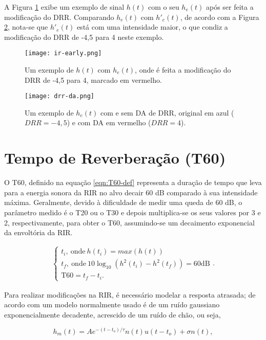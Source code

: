 A Figura \ref{fig:ir-early} exibe um exemplo de sinal $h(t)$ com o seu $h_e(t)$ após ser feita a modificação do DRR.
Comparando $h_e(t)$ com $h'_e(t)$, de acordo com a Figura \ref{fig:drr-da}, nota-se que $h'_e(t)$  está com uma intensidade 
maior, o que condiz a modificação do DRR de -4,5 para 4 neste exemplo.

\begin{figure}[H]
    \centering
    \texttt{[image: ir-early.png]}
    \caption{Um exemplo de $h(t)$ com $h_e(t)$, onde é feita a modificação do DRR de -4,5 para 4, marcado em vermelho.}
    \label{fig:ir-early}
\end{figure} 

\begin{figure}[H]
    \centering
    \texttt{[image: drr-da.png]}
    \caption{Um exemplo de $h_e(t)$ com e sem DA de DRR, original em azul ($DRR=-4,5$) e com DA em vermelho ($DRR=4$).}
    \label{fig:drr-da}
\end{figure} 


\section{Tempo de Reverberação (T60)}


O T60, definido na equação \ref{eqn:T60-def} representa a duração de tempo que leva para a energia sonora da RIR
no alvo decair 60 dB comparado à sua intensidade máxima. Geralmente, devido à dificuldade de medir uma queda de 60 dB,
o parâmetro medido é o T20 ou o T30 e depois multiplica-se os seus valores por 3 e 2, respectivamente, para obter o T60,
assumindo-se um decaimento exponencial da envoltória da RIR.

\begin{align} \label{eqn:T60-def}
    \begin{cases}
        t_i, \ \text{onde} \ h(t_i) = max(h(t)) \\
        t_f, \ \text{onde} \ 10 \log_{10} \left( h^2(t_i) - h^2(t_f) \right) = 60 \text{dB} \\
        \text{T60} = t_f-t_i.
    \end{cases}
    .
\end{align}

Para realizar modificações na RIR, é necessário modelar a resposta atrasada; de acordo com \cite{RIR_Data_Aug}
um modelo normalmente usado é de um ruído gaussiano exponencialmente decadente, acrescido de um ruído de chão, ou seja,

\begin{equation} \label{eqn:h_l-gauss}
    h_m(t) = A e^{-(t - t_o)/ \tau} n(t) u(t - t_o) + \sigma n(t)
    ,
\end{equation}

